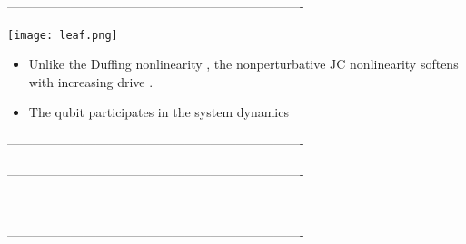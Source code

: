 \documentclass{beamer}
\begin{document}
----------------------------------------------------------------------
\begin{frame}
    \begin{center}
        \texttt{[image: leaf.png]}
    \end{center}
    \begin{itemize}
        \item Unlike the Duffing nonlinearity 
            ,
            the nonperturbative JC nonlinearity softens with 
            increasing drive
            .
        \item The qubit participates in the system dynamics
    \end{itemize}
\end{frame}
----------------------------------------------------------------------
\begin{frame}
    
\end{frame}
----------------------------------------------------------------------
\begin{frame}
    \printbibliography\
\end{frame}
----------------------------------------------------------------------
\end{document}
